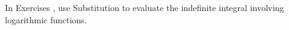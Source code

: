 {\noindent In Exercises}
{, use Substitution to evaluate the indefinite integral involving logarithmic functions.}
